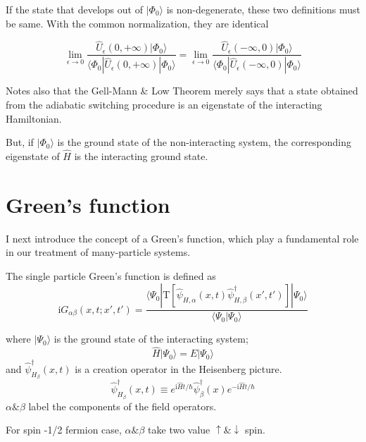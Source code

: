 
If the state that develops out of $|\Phi_0\rangle$ is non-degenerate, these two definitions must be same. With the common normalization, they are identical

\[\lim_{\epsilon\to0}\frac{\hat{U}_\epsilon(0,+\infty)|\Phi_0\rangle}{\langle\Phi_0|\hat{U}_\epsilon(0,+\infty)|\Phi_0\rangle}=\lim_{\epsilon\to0}\frac{\hat{U}_\epsilon(-\infty,0)|\Phi_0\rangle}{\langle\Phi_0|\hat{U}_\epsilon(-\infty,0)|\Phi_0\rangle} \]

Notes also that the Gell-Mann \& Low Theorem merely says that a state obtained from the adiabatic switching procedure is an eigenstate of the interacting Hamiltonian. 

But, if $|\Phi_0\rangle$ is the ground state of the non-interacting system, the corresponding eigenstate of $\hat{H}$ is {} the interacting ground state. 




\section{Green's function}

I next introduce the concept of a Green's function, which play a fundamental role in our treatment of many-particle systems.

The single particle Green's function is defined as
\begin{equation}\label{2.3.1}
\mathrm{i}G_{\alpha\beta}(x,t;x',t')=\frac{\langle\Psi_0|\mathrm{T}[\hat \psi_{H,\alpha}(x,t)\hat \psi^{\dagger}_{H,\beta} (x',t')]|\Psi_0\rangle}{\langle\Psi_0|\Psi_0\rangle}
\end{equation}

where $|\Psi_0\rangle$ is the ground state of the interacting system;
\begin{equation}
\hat{H}|\Psi_0\rangle=E|\Psi_0\rangle \nonumber
\end{equation}
and $\hat \psi^{
\dagger}_{H_{\beta}}(x,t)$ is a creation operator in the Heisenberg picture.
\begin{equation}
\hat \psi^{
\dagger}_{H_{\beta}}(x,t) \equiv e^{\mathrm{i}\hat{H}t/\hbar}\hat \psi^{
\dagger}_{\beta}(x)e^{-\mathrm{i}\hat{H}t/\hbar} \nonumber
\end{equation}
$\alpha \& \beta$ label the components of the field operators.

For spin -1/2 fermion case, $\alpha \& \beta$ take two value $\uparrow \& \downarrow$ spin.

